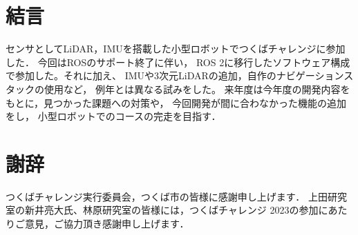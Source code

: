 \documentclass[twocolumn,9pt]{jsproceedings}
\begin{document}
\section{結言}
センサとしてLiDAR，IMUを搭載した小型ロボットでつくばチャレンジに参加した．
今回はROSのサポート終了に伴い，
ROS 2に移行したソフトウェア構成で参加した。それに加え、
IMUや3次元LiDARの追加，自作のナビゲーションスタックの使用など，
例年とは異なる試みをした。
来年度は今年度の開発内容をもとに，見つかった課題への対策や，
今回開発が間に合わなかった機能の追加をし，
小型ロボットでのコースの完走を目指す．


\section*{謝辞}
つくばチャレンジ実行委員会，つくば市の皆様に感謝申し上げます．
上田研究室の新井亮大氏、林原研究室の皆様には，つくばチャレンジ 2023の参加にあたりご意見，ご協力頂き感謝申し上げます．
\end{document}
